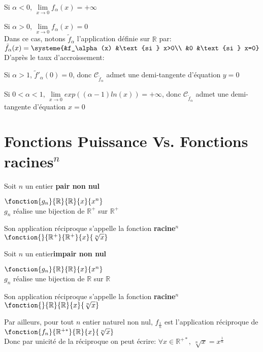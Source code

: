 \documentclass[12pt,twoside,a4paper]{article}
\begin{document}
				\begin{liste}
					\item Si $\alpha<0$, $\lim\limits_{x\rightarrow0}f_\alpha(x)=+\infty$
					\item Si $\alpha>0$, $\lim\limits_{x\rightarrow0}f_\alpha(x)=0$\\
							Dans ce cas, notons $\tilde{f}_\alpha$ l'application d\'efinie sur $\mathbb{R}$ par:\\
							$\tilde{f}_\alpha(x)=\systeme{&f_\alpha(x) &\text{si } x>0\\
							&0 &\text{si } x=0}$\\
							D'apr\`es le taux d'accroissement:\begin{liste}
								\item Si $\alpha>1$, $\tilde{f}'_\alpha(0)=0$, donc $\mathscr{C}_{\tilde{f}_\alpha}$ admet une demi-tangente d'\'equation $y=0$
								\item Si $0<\alpha<1$, $\lim\limits_{x\rightarrow0}exp((\alpha-1)ln(x))=+\infty$, donc $\mathscr{C}_{\tilde{f}_\alpha}$ admet une demi-tangente d'\'equation $x=0$
							\end{liste}
				\end{liste}
	\section{Fonctions Puissance Vs. Fonctions racines$^n$}
		\begin{liste}
			\item Soit $n$ un entier \textbf{pair non nul}
					\begin{tab}
						$\fonction{g_n}{\mathbb{R}}{\mathbb{R}}{x}{x^n}$\\
						$g_n$ r\'ealise une bijection de $\mathbb{R}^+$ sur $\mathbb{R}^+$
					\end{tab}
					Son application r\'eciproque s'appelle la fonction \textbf{racine$^n$}
					$\fonction{}{\mathbb{R}^+}{\mathbb{R}^+}{x}{\sqrt[n]{x}}$
			\item Soit $n$ un entier\textbf{impair non nul}
					\begin{tab}
						$\fonction{g_n}{\mathbb{R}}{\mathbb{R}}{x}{x^n}$\\
						$g_n$ r\'ealise une bijection de $\mathbb{R}$ sur $\mathbb{R}$
					\end{tab}
					Son application r\'eciproque s'appelle la fonction \textbf{racine$^n$}
					$\fonction{}{\mathbb{R}}{\mathbb{R}}{x}{\sqrt[n]{x}}$
			\item Par ailleurs, pour tout $n$ entier naturel non nul, $f_\frac{1}{n}$ est l'application r\'eciproque de $\fonction{f_n}{\mathbb{R}^{+*}}{\mathbb{R}}{x}{\sqrt[n]{x}}$\\
			Donc par unicit\'e de la r\'eciproque on peut \'ecrire: $\forall x\in\mathbb{R}^{+*},\ \sqrt[n]{x}=x^\frac{1}{n}$\\
		\end{liste}
\end{document}
